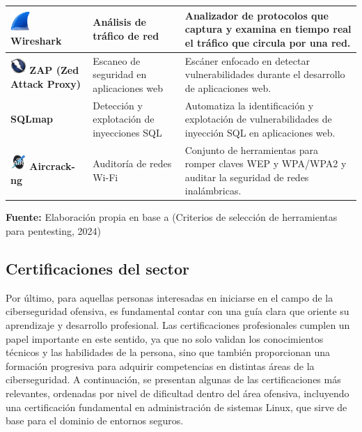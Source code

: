 \documentclass[a4paper, 10pt]{article}
\begin{document}
\begin{table}[H]
\begin{tabular}{|m{5cm}|m{3.5cm}|m{8cm}|}
    \hline
    \includegraphics[width=0.75cm]{images/wireshark.png} \textbf{Wireshark} & Análisis de tráfico de red & Analizador de protocolos que captura y examina en tiempo real el tráfico que circula por una red. \\
    \hline
    \includegraphics[width=0.6cm]{images/zap.jpeg} \textbf{ZAP (Zed Attack Proxy)} & Escaneo de seguridad en aplicaciones web & Escáner enfocado en detectar vulnerabilidades durante el desarrollo de aplicaciones web. \\
    \hline
    \textbf{SQLmap} & Detección y explotación de inyecciones SQL & Automatiza la identificación y explotación de vulnerabilidades de inyección SQL en aplicaciones web. \\
    \hline
    \includegraphics[width=0.6cm]{images/aircrack.jpeg} \textbf{Aircrack-ng} & Auditoría de redes Wi-Fi & Conjunto de herramientas para romper claves WEP y WPA/WPA2 y auditar la seguridad de redes inalámbricas. \\
    \hline
\end{tabular}
\begin{flushleft}\centering
    \footnotesize \textbf{Fuente:} Elaboración propia en base a (Criterios de selección de herramientas para pentesting, 2024)
\end{flushleft}
\end{table}

    
    

\subsection{Certificaciones del sector}

Por último, para aquellas personas interesadas en iniciarse en el campo de la ciberseguridad ofensiva, 
es fundamental contar con una guía clara que oriente su aprendizaje y desarrollo profesional. Las certificaciones 
profesionales cumplen un papel importante en este sentido, ya que no solo validan los conocimientos técnicos y las habilidades de la persona, sino que también proporcionan una formación progresiva para adquirir competencias en distintas áreas de la ciberseguridad. A continuación, se presentan algunas de las certificaciones más relevantes, ordenadas por nivel de dificultad dentro del área ofensiva, incluyendo una certificación fundamental en administración de sistemas Linux, que sirve de base para el dominio de entornos seguros.
\end{document}
